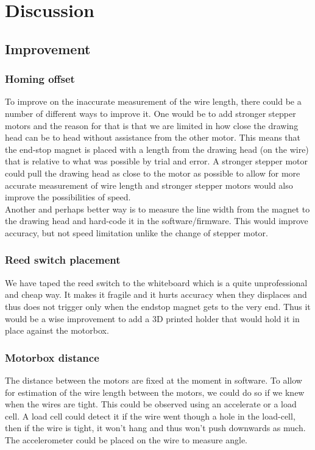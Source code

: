 
\section{Discussion} 
\subsection{Improvement}
\subsubsection{Homing offset}
To improve on the inaccurate measurement of the wire length, there could be a number of different ways to improve it. One would be to add stronger stepper motors and the reason for that is that we are limited in how close the drawing head can be to head without assistance from the other motor. This means that the end-stop magnet is placed with a length from the drawing head (on the wire) that is relative to what was possible by trial and error. A stronger stepper motor could pull the drawing head as close to the motor as possible to allow for more accurate measurement of wire length and stronger stepper motors would also improve the possibilities of speed. \\
Another and perhaps better way is to measure the line width from the magnet to the drawing head and hard-code it in the software/firmware. This would improve accuracy, but not speed limitation unlike the change of stepper motor.

\subsubsection{Reed switch placement}
We have taped the reed switch to the whiteboard which is a quite unprofessional and cheap way. It makes it fragile and it hurts accuracy when they displaces and thus does not trigger only when the endstop magnet gets to the very end. Thus it would be a wise improvement to add a 3D printed holder that would hold it in place against the motorbox.

\subsubsection{Motorbox distance}
The distance between the motors are fixed at the moment in software. To allow for estimation of the wire length between the motors, we could do so if we knew when the wires are tight. This could be observed using an accelerate or a load cell. A load cell could detect it if the wire went though a hole in the load-cell, then if the wire is tight, it won't hang and thus won't push downwards as much. The accelerometer could be placed on the wire to measure angle.

